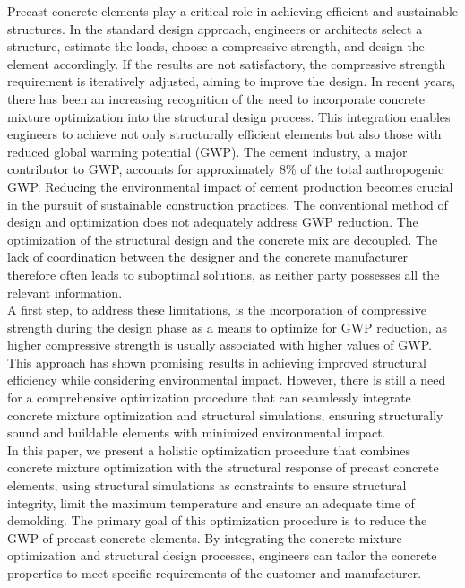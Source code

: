 Precast concrete elements play a critical role in achieving efficient and sustainable structures. 
In the standard design approach, engineers or architects select a structure, estimate the loads, choose a compressive strength, and design the element accordingly. 
If the results are not satisfactory, the compressive strength requirement is iteratively adjusted, aiming to improve the design.
In recent years, there has been an increasing recognition of the need to incorporate concrete mixture optimization into the structural design process. 
This integration enables engineers to achieve not only structurally efficient elements but also those with reduced global warming potential (GWP). 
The cement industry, a major contributor to GWP, accounts for approximately 8\% of the total anthropogenic GWP. 
Reducing the environmental impact of cement production becomes crucial in the pursuit of sustainable construction practices.
The conventional method of design and optimization does not adequately address GWP reduction.
The optimization of the structural design and the concrete mix are decoupled.
The lack of coordination between the designer and the concrete manufacturer therefore often leads to suboptimal solutions, as neither party possesses all the relevant information.\\

A first step, to address these limitations, is the incorporation of compressive strength during the design phase as a means to optimize for GWP reduction, as higher compressive strength is usually associated with higher values of GWP. 
This approach has shown promising results in achieving improved structural efficiency while considering environmental impact. 
However, there is still a need for a comprehensive optimization procedure that can seamlessly integrate concrete mixture optimization and structural simulations, ensuring structurally sound and buildable elements with minimized environmental impact.\\

In this paper, we present a holistic optimization procedure that combines concrete mixture optimization with the structural response of precast concrete elements, using structural simulations as constraints to ensure structural integrity, limit the maximum temperature and ensure an adequate time of demolding.
The primary goal of this optimization procedure is to reduce the GWP of precast concrete elements. 
By integrating the concrete mixture optimization and structural design processes, engineers can tailor the concrete properties to meet specific requirements of the customer and manufacturer.\\

